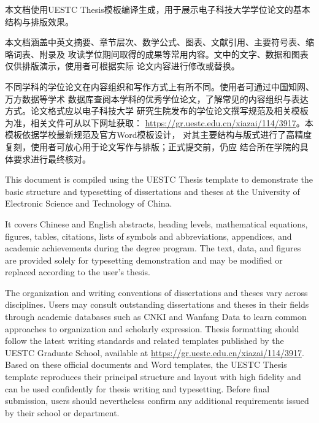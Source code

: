 \zhabstract

本文档使用UESTC Thesis模板编译生成，用于展示电子科技大学学位论文的基本结构与排版效果。

本文档涵盖中英文摘要、章节层次、数学公式、图表、文献引用、主要符号表、缩略词表、附录及
攻读学位期间取得的成果等常用内容。文中的文字、数据和图表仅供排版演示，使用者可根据实际
论文内容进行修改或替换。

不同学科的学位论文在内容组织和写作方式上有所不同。使用者可通过中国知网、万方数据等学术
数据库查阅本学科的优秀学位论文，了解常见的内容组织与表达方式。论文格式应以电子科技大学
研究生院发布的学位论文撰写规范及相关模板为准，相关文件可从以下网址获取：
\url{https://gr.uestc.edu.cn/xiazai/114/3917}。本模板依据学校最新规范及官方Word模板设计，
对其主要结构与版式进行了高精度复刻，使用者可放心用于论文写作与排版；正式提交前，仍应
结合所在学院的具体要求进行最终核对。


\enabstract

This document is compiled using the UESTC Thesis template to demonstrate the
basic structure and typesetting of dissertations and theses at the University
of Electronic Science and Technology of China.

It covers Chinese and English abstracts, heading levels, mathematical equations,
figures, tables, citations, lists of symbols and abbreviations, appendices, and
academic achievements during the degree program. The text, data, and figures are
provided solely for typesetting demonstration and may be modified or replaced
according to the user's thesis.

The organization and writing conventions of dissertations and theses vary across
disciplines. Users may consult outstanding dissertations and theses in their
fields through academic databases such as CNKI and Wanfang Data to learn common
approaches to organization and scholarly expression. Thesis formatting should
follow the latest writing standards and related templates published by the UESTC
Graduate School, available at \url{https://gr.uestc.edu.cn/xiazai/114/3917}.
Based on these official documents and Word templates, the UESTC Thesis template
reproduces their principal structure and layout with high fidelity and can be
used confidently for thesis writing and typesetting. Before final submission,
users should nevertheless confirm any additional requirements issued by their
school or department.

